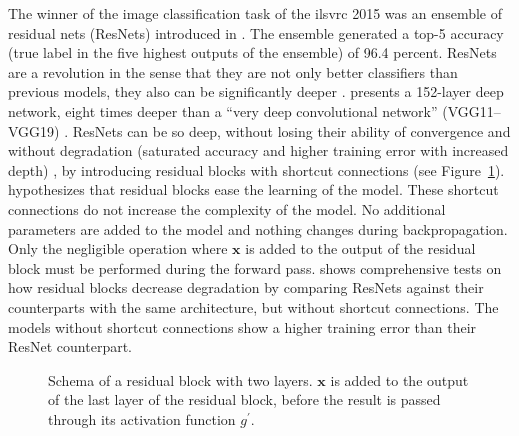 \documentclass[]{article}
\begin{document}
The winner of the image classification task of the \acrshort{ilsvrc} 2015 was an
ensemble of residual nets (ResNets) introduced in
\citet{he_et_al_2015}.
The ensemble generated a top-5 accuracy (true label in the five
highest outputs of the ensemble) of 96.4 percent.
ResNets are a revolution in the sense that they are not only better
classifiers than previous models, they also can be significantly
deeper \citep{he_et_al_2015}.
\citet{he_et_al_2015} presents a 152-layer deep network, eight times
deeper than a ``very deep convolutional network'' (VGG11--VGG19)
\citep{simonyan_et_al_2014, he_et_al_2015}.
ResNets can be so deep, without losing their ability of convergence
and without degradation (saturated accuracy and higher training error
with increased depth) \citep{he_et_al_2015}, by introducing residual
blocks with shortcut connections (see Figure~\ref{fig:shortcut_conn}).
\citet{he_et_al_2015} hypothesizes that residual blocks ease the
learning of the model.
These shortcut connections do not increase the complexity of the
model. No additional parameters are added to the model and nothing
changes during backpropagation.
Only the negligible operation where $\mathbf{x}$ is added to the
output of the residual block must be performed during the forward
pass.
\citet{he_et_al_2015} shows comprehensive tests on how residual blocks
decrease degradation by comparing ResNets against their
counterparts with the same architecture, but without shortcut
connections.
The models without shortcut connections show a higher training error
than their ResNet counterpart.

\begin{figure}
  \begin{center}
  \end{center}
  \caption{Schema of a residual block with two layers. $\mathbf{x}$ is
    added to the output of the last layer of the residual block,
    before the result is passed through its activation function
    $g^\prime$.}
  \label{fig:shortcut_conn}
\end{figure}
\end{document}

